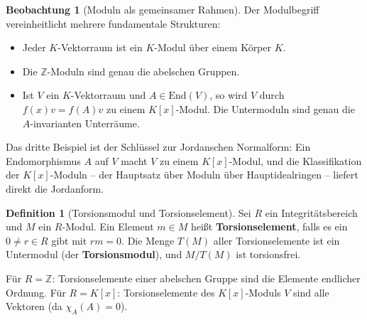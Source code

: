 ﻿\documentclass[a4paper,12pt]{report}
\theoremstyle{definition}
\newtheorem{definition}{Definition}
\newtheorem{beobachtung}{Beobachtung}
\begin{document}
\begin{beobachtung}[Moduln als gemeinsamer Rahmen]
    Der Modulbegriff vereinheitlicht mehrere fundamentale Strukturen:
    \begin{itemize}
        \item[-] Jeder $K$-Vektorraum ist ein $K$-Modul über einem Körper $K$.
        \item[-] Die $\mathbb{Z}$-Moduln sind genau die abelschen Gruppen.
        \item[-] Ist $V$ ein $K$-Vektorraum und $A \in \mathrm{End}(V)$,
              so wird $V$ durch $f(x) v = f(A)v$ zu einem $K[x]$-Modul.
              Die Untermoduln sind genau die $A$-invarianten Unterräume.
    \end{itemize}
    Das dritte Beispiel ist der Schlüssel zur Jordanschen Normalform:
    Ein Endomorphismus $A$ auf $V$ macht $V$ zu einem $K[x]$-Modul,
    und die Klassifikation der $K[x]$-Moduln -- der Hauptsatz über
    Moduln über Hauptidealringen -- liefert direkt die Jordanform.
\end{beobachtung}

\begin{definition}[Torsionsmodul und Torsionselement]
    Sei $R$ ein Integritätsbereich und $M$ ein $R$-Modul. Ein Element
    $m \in M$ heißt \textbf{Torsionselement}, falls es ein $0 \neq r \in R$
    gibt mit $rm = 0$. Die Menge $T(M)$ aller Torsionselemente ist ein
    Untermodul (der \textbf{Torsionsmodul}), und $M/T(M)$ ist
    torsionsfrei.

    Für $R = \mathbb{Z}$: Torsionselemente einer abelschen Gruppe sind
    die Elemente endlicher Ordnung. Für $R = K[x]$: Torsionselemente
    des $K[x]$-Moduls $V$ sind alle Vektoren (da $\chi_A(A) = 0$).
\end{definition}
\end{document}
